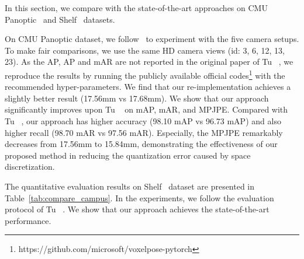 \documentclass[10pt,twocolumn,letterpaper]{article}
\begin{document}
In this section, we compare with the state-of-the-art approaches on CMU Panoptic~\cite{joo2017panoptic} and Shelf~\cite{belagiannis20143d} datasets. 

On CMU Panoptic dataset, we follow~\cite{tu2020voxelpose} to experiment with the five camera setups. To make fair comparisons, we use the same HD camera views (id: 3, 6, 12, 13, 23). As the AP, AP and mAR are not reported in the original paper of Tu \etal~\cite{tu2020voxelpose}, we reproduce the results by running the publicly available official codes\footnote{https://github.com/microsoft/voxelpose-pytorch} with the recommended hyper-parameters. We find that our re-implementation achieves a slightly better result (17.56mm vs 17.68mm). We show that our approach significantly improves upon Tu \etal~\cite{tu2020voxelpose} on mAP, mAR, and MPJPE. Compared with Tu \etal~\cite{tu2020voxelpose}, our approach has higher accuracy (98.10 mAP vs 96.73 mAP) and also higher recall (98.70 mAR vs 97.56 mAR).
Especially, the MPJPE remarkably decreases from 17.56mm to 15.84mm, demonstrating the effectiveness of our proposed method in reducing the quantization error caused by space discretization. 

The quantitative evaluation results on Shelf~\cite{belagiannis20143d} dataset are presented in Table~\ref{tab:compare_campus}. 
In the experiments, we follow the evaluation protocol of Tu \etal~\cite{tu2020voxelpose}. We show that our approach achieves the state-of-the-art performance.


\begin{table}[h]
    \centering
    \caption{Quantitative comparisons to the state-of-the-art approaches on Shelf~\cite{belagiannis20143d} datasets. The metric is the percentage of correctly estimated parts (PCP3D). `†' means method with temporal information.}
    \label{tab:compare_campus}
\end{table}
\end{document}
